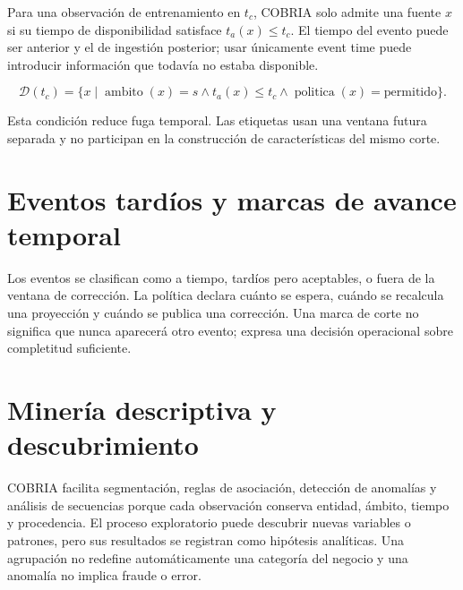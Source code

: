 Para una observación de entrenamiento en $t_c$, COBRIA solo admite una fuente $x$ si su
tiempo de disponibilidad satisface $t_a(x)\leq t_c$. El tiempo del evento puede ser
anterior y el de ingestión posterior; usar únicamente event time puede introducir
información que todavía no estaba disponible.

\begin{equation}
\mathcal{D}(t_c)=\{x\mid \operatorname{ambito}(x)=s\land t_a(x)\leq t_c\land
\operatorname{politica}(x)=\mathrm{permitido}\}.
\end{equation}

Esta condición reduce fuga temporal. Las etiquetas usan una ventana futura separada y
no participan en la construcción de características del mismo corte.


\section{Eventos tardíos y marcas de avance temporal}

Los eventos se clasifican como a tiempo, tardíos pero aceptables, o fuera de la ventana
de corrección. La política declara cuánto se espera, cuándo se recalcula una proyección
y cuándo se publica una corrección. Una marca de corte no significa que nunca aparecerá otro
evento; expresa una decisión operacional sobre completitud suficiente.

\section{Minería descriptiva y descubrimiento}

COBRIA facilita segmentación, reglas de asociación, detección de anomalías y análisis de
secuencias porque cada observación conserva entidad, ámbito, tiempo y procedencia. El
proceso exploratorio puede descubrir nuevas variables o patrones, pero sus resultados
se registran como hipótesis analíticas. Una agrupación no redefine automáticamente una
categoría del negocio y una anomalía no implica fraude o error.

